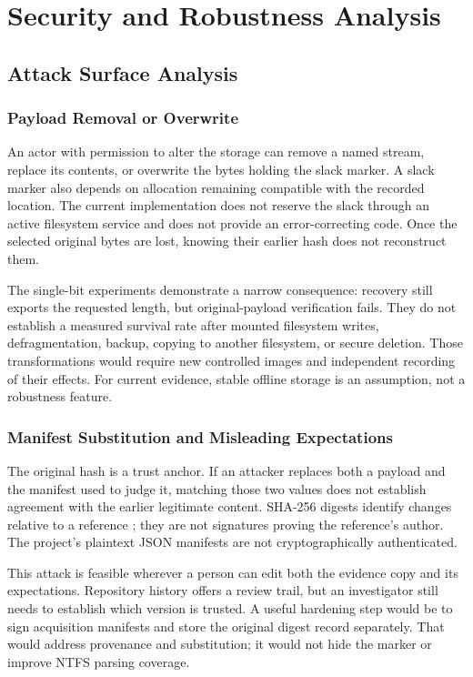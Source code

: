 \chapter{Security and Robustness Analysis}
\section{Attack Surface Analysis}
\subsection{Payload Removal or Overwrite}
An actor with permission to alter the storage can remove a named stream,
replace its contents, or overwrite the bytes holding the slack marker. A
slack marker also depends on allocation remaining compatible with the
recorded location. The current implementation does not reserve the slack
through an active filesystem service and does not provide an error-correcting
code. Once the selected original bytes are lost, knowing their earlier hash
does not reconstruct them.

The single-bit experiments demonstrate a narrow consequence: recovery still
exports the requested length, but original-payload verification fails. They
do not establish a measured survival rate after mounted filesystem writes,
defragmentation, backup, copying to another filesystem, or secure deletion.
Those transformations would require new controlled images and independent
recording of their effects. For current evidence, stable offline storage is
an assumption, not a robustness feature.

\subsection{Manifest Substitution and Misleading Expectations}
The original hash is a trust anchor. If an attacker replaces both a payload
and the manifest used to judge it, matching those two values does not
establish agreement with the earlier legitimate content. SHA-256 digests
identify changes relative to a reference \cite{sha}; they are not signatures
proving the reference's author. The project's plaintext JSON manifests are
not cryptographically authenticated.

This attack is feasible wherever a person can edit both the evidence copy
and its expectations. Repository history offers a review trail, but an
investigator still needs to establish which version is trusted. A useful
hardening step would be to sign acquisition manifests and store the original
digest record separately. That would address provenance and substitution;
it would not hide the marker or improve NTFS parsing coverage.

